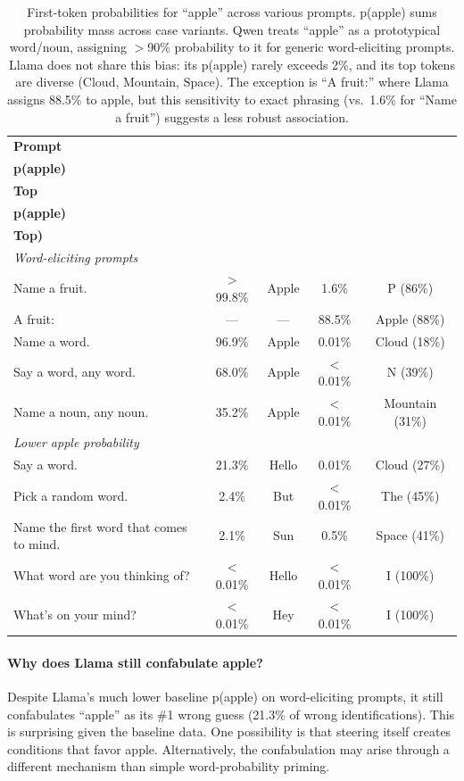 \documentclass{article}
\begin{document}
\begin{table}[H]
\centering
\small
\begin{tabular}{lcccc}
\toprule
\textbf{Prompt} & \shortstack{\textbf{Qwen}\\\textbf{p(apple)}} & \shortstack{\textbf{Qwen}\\\textbf{Top}} & \shortstack{\textbf{Llama}\\\textbf{p(apple)}} & \shortstack{\textbf{Llama}\\\textbf{Top)}} \\
\midrule
\multicolumn{5}{l}{\textit{Word-eliciting prompts}} \\
Name a fruit. & $>$99.8\% & Apple & 1.6\% & P (86\%) \\
A fruit: & --- & --- & 88.5\% & Apple (88\%) \\
Name a word. & 96.9\% & Apple & 0.01\% & Cloud (18\%) \\
Say a word, any word. & 68.0\% & Apple & $<$0.01\% & N (39\%) \\
Name a noun, any noun. & 35.2\% & Apple & $<$0.01\% & Mountain (31\%) \\
\midrule
\multicolumn{5}{l}{\textit{Lower apple probability}} \\
Say a word. & 21.3\% & Hello & 0.01\% & Cloud (27\%) \\
Pick a random word. & 2.4\% & But & $<$0.01\% & The (45\%) \\
Name the first word that comes to mind. & 2.1\% & Sun & 0.5\% & Space (41\%) \\
What word are you thinking of? & $<$0.01\% & Hello & $<$0.01\% & I (100\%) \\
What's on your mind? & $<$0.01\% & Hey & $<$0.01\% & I (100\%) \\
\bottomrule
\end{tabular}
\caption{First-token probabilities for ``apple'' across various prompts. p(apple) sums probability mass across case variants. Qwen treats ``apple'' as a prototypical word/noun, assigning $>$90\% probability to it for generic word-eliciting prompts. Llama does not share this bias: its p(apple) rarely exceeds 2\%, and its top tokens are diverse (Cloud, Mountain, Space). The exception is ``A fruit:'' where Llama assigns 88.5\% to apple, but this sensitivity to exact phrasing (vs.\ 1.6\% for ``Name a fruit'') suggests a less robust association.}
\label{tab:apple-baseline}
\end{table}


\paragraph{Why does Llama still confabulate apple?} Despite Llama's much lower baseline p(apple) on word-eliciting prompts, it still confabulates ``apple'' as its \#1 wrong guess (21.3\% of wrong identifications). This is surprising given the baseline data. One possibility is that steering itself creates conditions that favor apple.  Alternatively, the confabulation may arise through a different mechanism than simple word-probability priming.
\end{document}
